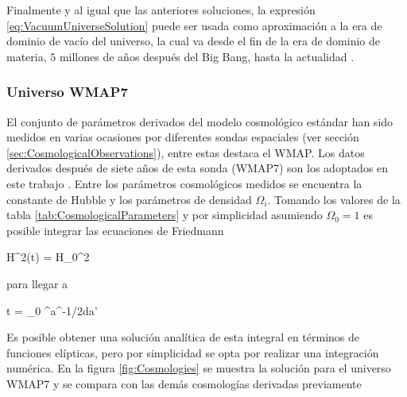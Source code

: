 Finalmente y al igual que las anteriores soluciones, la expresión 
\ref{eq:VacuumUniverseSolution} puede ser usada como aproximación a la era
de dominio de vacío del universo, la cual va desde el fin de la era de 
dominio de materia, $5$ millones de años después del 
Big Bang, hasta la actualidad \cite{longair2008}.


			\subsubsection*{Universo WMAP7}
			
El conjunto de parámetros derivados del modelo cosmológico estándar han 
sido medidos en varias ocasiones por diferentes sondas espaciales (ver 
sección \ref{sec:CosmologicalObservations}), entre estas destaca el WMAP. 
Los datos derivados después de siete años de esta sonda (WMAP7) son los 
adoptados en este trabajo \cite{WMAP7}. Entre los parámetros cosmológicos 
medidos se encuentra la constante de Hubble y los parámetros de densidad 
$\Omega_i$. Tomando los valores de la tabla \ref{tab:CosmologicalParameters} 
y por simplicidad asumiendo $\Omega_0 = 1$ es posible integrar las 
ecuaciones de Friedmann


{ H^2(t) = H_0^2  }


para llegar a


{ t = \int _0 ^{a}^{-1/2}da' }


Es posible obtener una solución analítica de esta integral en términos de 
funciones elípticas, pero por simplicidad se opta por realizar una 
integración numérica. En la figura \ref{fig:Cosmologies} se muestra la 
solución para el universo WMAP7 y se compara con las demás cosmologías 
derivadas previamente








